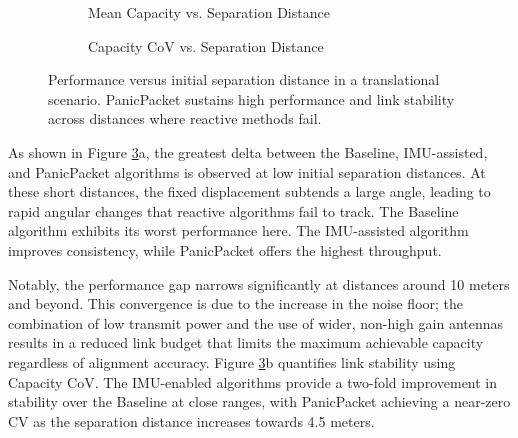\documentclass[fleqn,10pt]{wlscirep}
\begin{document}
\begin{figure}[h!]
    \centering
    \begin{subfigure}{0.495\linewidth}
        
        \vspace{-25 pt}
        \caption{Mean Capacity vs. Separation Distance}
        \label{fig:dist_rate}
    \end{subfigure}
    \hfill
    \begin{subfigure}{0.495\linewidth}
        
        \vspace{-25 pt}
        \caption{Capacity CoV vs. Separation Distance}
        \label{fig:dist_cov}
    \end{subfigure}
    \caption{Performance versus initial separation distance in a translational scenario. PanicPacket sustains high performance and link stability across distances where reactive methods fail.}
    \label{fig:distance_effects}
\end{figure} 

As shown in Figure \ref{fig:distance_effects}a, the greatest delta between the Baseline, IMU-assisted, and PanicPacket algorithms is observed at low initial separation distances. At these short distances, the fixed displacement subtends a large angle, leading to rapid angular changes that reactive algorithms fail to track. The Baseline algorithm exhibits its worst performance here. The IMU-assisted algorithm improves consistency, while PanicPacket offers the highest throughput.

Notably, the performance gap narrows significantly at distances around 10 meters and beyond. This convergence is due to the increase in the noise floor; the combination of low transmit power and the use of wider, non-high gain antennas results in a reduced link budget that limits the maximum achievable capacity regardless of alignment accuracy. Figure \ref{fig:distance_effects}b quantifies link stability using Capacity CoV. The IMU-enabled algorithms provide a two-fold improvement in stability over the Baseline at close ranges, with PanicPacket achieving a near-zero CV as the separation distance increases towards 4.5 meters.
\end{document}
